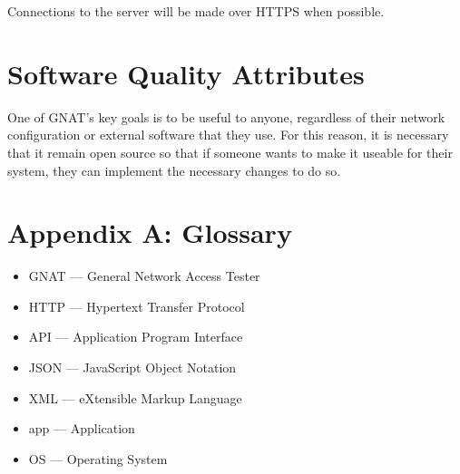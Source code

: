 \documentclass{scrreprt}
\begin{document}
Connections to the server will be made over HTTPS when possible.

\section{Software Quality Attributes}
One of GNAT's key goals is to be useful to anyone, regardless of their network configuration or external software that they use.  For this reason, it is necessary that it remain open source so that if someone wants to make it useable for their system, they can implement the necessary changes to do so.

\section{Appendix A: Glossary}
\begin{itemize}
  \item GNAT --- General Network Access Tester
  \item HTTP --- Hypertext Transfer Protocol
  \item API --- Application Program Interface
  \item JSON --- JavaScript Object Notation
  \item XML --- eXtensible Markup Language
  \item app --- Application
    \item OS --- Operating System
\end{itemize}
\end{document}
